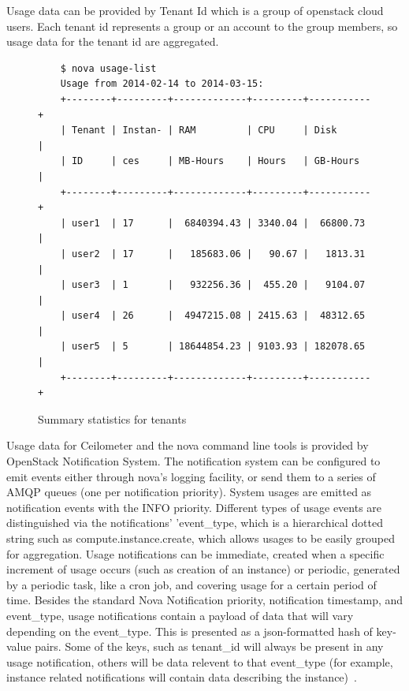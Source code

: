 \documentclass{sig-alternate-05-2015}
\begin{document}
Usage data can be provided by Tenant Id which is a group of openstack cloud users. Each tenant id represents a group or an account to the group members, so usage data for the tenant id are aggregated. 

\begin{figure}[htb]
\begin{scriptsize}
\begin{verbatim}
    $ nova usage-list
    Usage from 2014-02-14 to 2014-03-15:
    +--------+---------+-------------+---------+-----------+
    | Tenant | Instan- | RAM         | CPU     | Disk      |
    | ID     | ces     | MB-Hours    | Hours   | GB-Hours  |
    +--------+---------+-------------+---------+-----------+
    | user1  | 17      |  6840394.43 | 3340.04 |  66800.73 |
    | user2  | 17      |   185683.06 |   90.67 |   1813.31 |
    | user3  | 1       |   932256.36 |  455.20 |   9104.07 |
    | user4  | 26      |  4947215.08 | 2415.63 |  48312.65 |
    | user5  | 5       | 18644854.23 | 9103.93 | 182078.65 |
    +--------+---------+-------------+---------+-----------+
\end{verbatim}
\vspace{-20pt}
\end{scriptsize}

\caption{Summary statistics for tenants}
\label{F:host-describe}

\end{figure}


Usage data for Ceilometer and the nova command line tools is provided by OpenStack Notification System. The notification system can be configured to emit events either through nova's logging facility, or send them to a series of AMQP queues (one per notification priority). System usages are emitted as notification events with the INFO priority. Different types of usage events are distinguished via the notifications' 'event\_type, which is a hierarchical dotted string such as compute.instance.create, which allows usages to be easily grouped for aggregation. Usage notifications can be immediate, created when a specific increment of usage occurs (such as creation of an instance) or periodic, generated by a periodic task, like a cron job, and covering usage for a certain period of time. Besides the standard Nova Notification priority, notification timestamp, and event\_type, usage notifications contain a payload of data that will vary depending on the event\_type. This is presented as a json-formatted hash of key-value pairs. Some of the keys, such as tenant\_id will always be present in any usage notification, others will be data relevent to that event\_type (for example, instance related notifications will contain data describing the instance)~\cite{SystemUsageData}.
\end{document}
